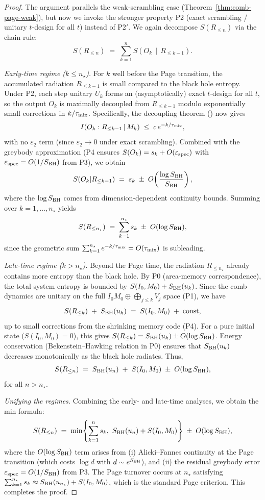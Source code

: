 \documentclass[a4paper,11pt]{article}
\theoremstyle{plain}
\theoremstyle{definition}
\theoremstyle{remark}
\begin{document}
\begin{proof}
The argument parallels the weak-scrambling case (Theorem~\ref{thm:comb-page-weak}), but now we invoke the stronger property P2 (exact scrambling / unitary $t$-design for all $t$) instead of P2$'$. We again decompose $S(R_{\le n})$ via the chain rule:
\[
S(R_{\le n}) \;=\; \sum_{k=1}^n S\!\left(O_k \,\middle|\, R_{\le k-1}\right).
\]

\emph{Early-time regime ($k\le n_\star$).}
For $k$ well before the Page transition, the accumulated radiation $R_{\le k-1}$ is small compared to the black hole entropy. Under P2, each step unitary $U_k$ forms an (asymptotically) exact $t$-design for all $t$, so the output $O_k$ is maximally decoupled from $R_{\le k-1}$ modulo exponentially small corrections in $k/\tau_{\rm mix}$. Specifically, the decoupling theorem () now gives
\[
I\!\left(O_k:R_{\le k-1}\,|\,M_k\right) \;\le\; c\,e^{-k/\tau_{\rm mix}},
\]
with no $\varepsilon_2$ term (since $\varepsilon_2\to0$ under exact scrambling). Combined with the greybody approximation (P4 ensures $S(O_k)=s_k+O(\varepsilon_{\rm spec})$ with $\varepsilon_{\rm spec}=O(1/S_{\rm BH})$ from P3), we obtain
\[
S(O_k|R_{\le k-1}) \;=\; s_k \;\pm\; O\!\left(\frac{\log S_{\rm BH}}{S_{\rm BH}}\right),
\]
where the $\log S_{\rm BH}$ comes from dimension-dependent continuity bounds. Summing over $k=1,\ldots,n_\star$ yields
\[
S(R_{\le n_\star}) \;=\; \sum_{k=1}^{n_\star} s_k \;\pm\; O(\log S_{\rm BH}),
\]
since the geometric sum $\sum_{k=1}^{n_\star} e^{-k/\tau_{\rm mix}}=O(\tau_{\rm mix})$ is subleading.

\emph{Late-time regime ($k> n_\star$).}
Beyond the Page time, the radiation $R_{\le n_\star}$ already contains more entropy than the black hole. By P0 (area-memory correspondence), the total system entropy is bounded by $S(I_0,M_0)+S_{\rm BH}(u_k)$. Since the comb dynamics are unitary on the full $I_0M_0\oplus \bigoplus_{j\le k} V_j$ space (P1), we have
\[
S(R_{\le k}) \;+\; S_{\rm BH}(u_k) \;=\; S(I_0,M_0) \;+\; \text{const},
\]
up to small corrections from the shrinking memory code (P4). For a pure initial state ($S(I_0,M_0)=0$), this gives $S(R_{\le k})=S_{\rm BH}(u_k)\pm O(\log S_{\rm BH})$. Energy conservation (Bekenstein--Hawking relation in P0) ensures that $S_{\rm BH}(u_k)$ decreases monotonically as the black hole radiates. Thus,
\[
S(R_{\le n}) \;=\; S_{\rm BH}(u_n) \;+\; S(I_0,M_0) \;\pm\; O(\log S_{\rm BH}),
\]
for all $n>n_\star$.

\emph{Unifying the regimes.}
Combining the early- and late-time analyses, we obtain the min formula:
\[
S(R_{\le n}) \;=\; \min\!\left\{\sum_{k=1}^n s_k,\ S_{\rm BH}(u_n)+S(I_0,M_0)\right\} \;\pm\; O(\log S_{\rm BH}),
\]
where the $O(\log S_{\rm BH})$ term arises from (i) Alicki--Fannes continuity at the Page transition (which costs $\log d$ with $d\sim e^{S_{\rm BH}}$), and (ii) the residual greybody error $\varepsilon_{\rm spec}=O(1/S_{\rm BH})$ from P3. The Page turnover occurs at $n_\star$ satisfying $\sum_{k=1}^{n_\star} s_k \approx S_{\rm BH}(u_{n_\star})+S(I_0,M_0)$, which is the standard Page criterion. This completes the proof.
\end{proof}
\end{document}
